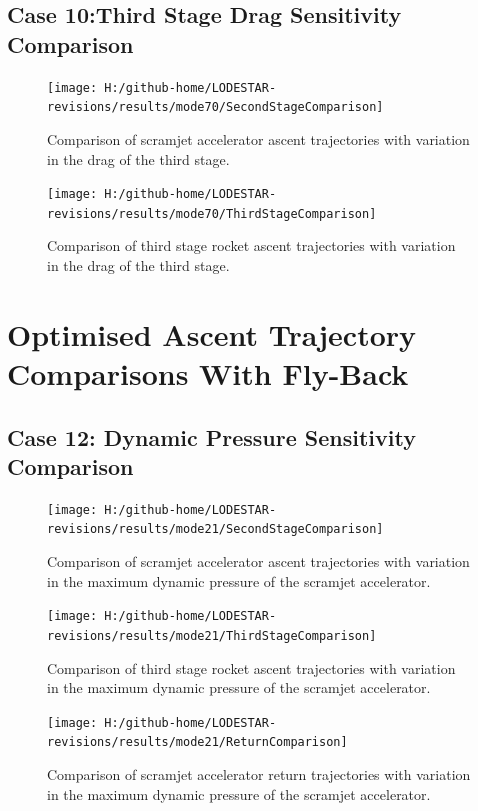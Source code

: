 \subsection{Case 10:Third Stage Drag Sensitivity Comparison}\label{sec:app_comparison70}
\begin{figure}[!th]
\centering
\texttt{[image: H:/github-home/LODESTAR-revisions/results/mode70/SecondStageComparison]}
\caption{Comparison of scramjet accelerator ascent trajectories with variation in the drag of the third stage.}
\label{fig:SecondStageComparison8}
\end{figure}
\begin{figure}[!th]
\centering
\texttt{[image: H:/github-home/LODESTAR-revisions/results/mode70/ThirdStageComparison]}
\caption{Comparison of third stage rocket ascent trajectories with variation in the drag of the third stage.}
\label{fig:ThirdStageComparison8}
\end{figure}
\FloatBarrier
\clearpage
\section{Optimised Ascent Trajectory Comparisons With Fly-Back}
\FloatBarrier
\subsection{Case 12: Dynamic Pressure Sensitivity Comparison}\label{sec:app_comparison21}
\begin{figure}[!th]
\centering
\texttt{[image: H:/github-home/LODESTAR-revisions/results/mode21/SecondStageComparison]}
\caption{Comparison of scramjet accelerator ascent trajectories with variation in the maximum dynamic pressure of the scramjet accelerator.}
\label{fig:SecondStageComparison9}
\end{figure}
\begin{figure}[!th]
\centering
\texttt{[image: H:/github-home/LODESTAR-revisions/results/mode21/ThirdStageComparison]}
\caption{Comparison of third stage rocket ascent trajectories with variation in the maximum dynamic pressure of the scramjet accelerator.}
\label{fig:ThirdStageComparison9}
\end{figure}
\begin{figure}[!th]
\centering
\texttt{[image: H:/github-home/LODESTAR-revisions/results/mode21/ReturnComparison]}
\caption{Comparison of scramjet accelerator return trajectories with variation in the maximum dynamic pressure of the scramjet accelerator.}
\label{fig:ReturnComparison}
\end{figure}
\FloatBarrier
\clearpage
